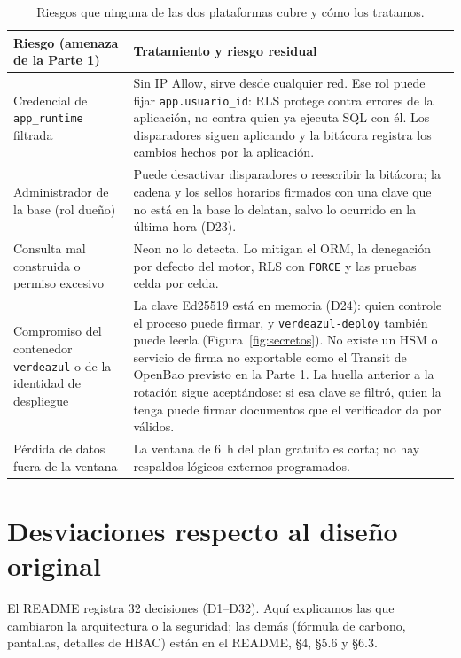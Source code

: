 \documentclass[10pt,letterpaper]{article}
\newcommand{\cod}[1]{\texttt{#1}}
\begin{document}
\begin{table}[ht]
\centering\footnotesize
\caption{Riesgos que ninguna de las dos plataformas cubre y cómo los tratamos.}
\label{tab:residuales}
\begin{tabularx}{\linewidth}{@{}P{4.4cm}Y@{}}
\toprule
\textbf{Riesgo (amenaza de la Parte 1)} & \textbf{Tratamiento y riesgo residual}\\
\midrule
Credencial de \cod{app\_runtime} filtrada & Sin IP Allow, sirve desde cualquier red. Ese rol puede fijar \cod{app.usuario\_id}: RLS protege contra errores de la aplicación, no contra quien ya ejecuta SQL con él. Los disparadores siguen aplicando y la bitácora registra los cambios hechos por la aplicación.\\
Administrador de la base (rol dueño) & Puede desactivar disparadores o reescribir la bitácora; la cadena y los sellos horarios firmados con una clave que no está en la base lo delatan, salvo lo ocurrido en la última hora (D23).\\
Consulta mal construida o permiso excesivo & Neon no lo detecta. Lo mitigan el ORM, la denegación por defecto del motor, RLS con \cod{FORCE} y las pruebas celda por celda.\\
Compromiso del contenedor \cod{verdeazul} o de la identidad de despliegue & La clave Ed25519 está en memoria (D24): quien controle el proceso puede firmar, y \cod{verdeazul-deploy} también puede leerla (Figura~\ref{fig:secretos}). No existe un HSM o servicio de firma no exportable como el Transit de OpenBao previsto en la Parte 1. La huella anterior a la rotación sigue aceptándose: si esa clave se filtró, quien la tenga puede firmar documentos que el verificador da por válidos.\\
Pérdida de datos fuera de la ventana & La ventana de 6~h del plan gratuito es corta; no hay respaldos lógicos externos programados.\\
\bottomrule
\end{tabularx}
\end{table}

\section{Desviaciones respecto al diseño original}
\label{sec:desviaciones}

El README registra 32 decisiones (D1--D32). Aquí explicamos las que cambiaron la arquitectura o la seguridad; las demás (fórmula de carbono, pantallas, detalles de HBAC) están en el README, §4, §5.6 y §6.3.
\end{document}
